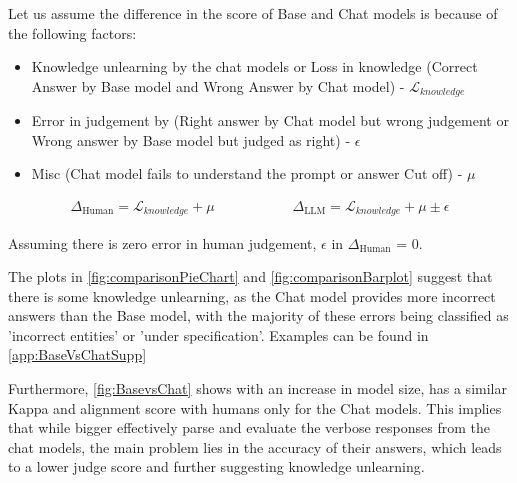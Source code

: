 Let us assume the difference in the score of Base and Chat models is because of the following factors:

\begin{itemize}[noitemsep]
\item Knowledge unlearning by the chat models or Loss in knowledge (Correct Answer by Base model and Wrong Answer by Chat model) - $\mathcal{L}_{knowledge}$
\item Error in judgement by \judgemodels (Right answer by Chat model but wrong judgement or Wrong answer by Base model but judged as right) - $\epsilon$
\item Misc (Chat model fails to understand the prompt or answer Cut off) - $\mu$
\end{itemize}

\[
\begin{array}{cc}
\Delta_{\text{Human}} = \mathcal{L}_{knowledge} + \mu & \hspace{2cm} \Delta_{\text{LLM}} = \mathcal{L}_{knowledge} + \mu \pm \epsilon
\end{array}
\]


Assuming there is zero error in human judgement, $\epsilon$ in $\Delta_{\text{Human}}$ = 0. 

The plots in \cref{fig:comparisonPieChart} and \cref{fig:comparisonBarplot} suggest that there is some knowledge unlearning, as the Chat model provides more incorrect answers than the Base model, with the majority of these errors being classified as 'incorrect entities' or 'under specification'. Examples can be found in \cref{app:BaseVsChatSupp}

Furthermore, \cref{fig:BasevsChat} shows with an increase in model size,  has a similar Kappa and alignment score with humans only for the Chat models. This implies that while bigger \judgemodels effectively parse and evaluate the verbose responses from the chat models, the main problem lies in the accuracy of their answers, which leads to a lower judge score and further suggesting knowledge unlearning.

